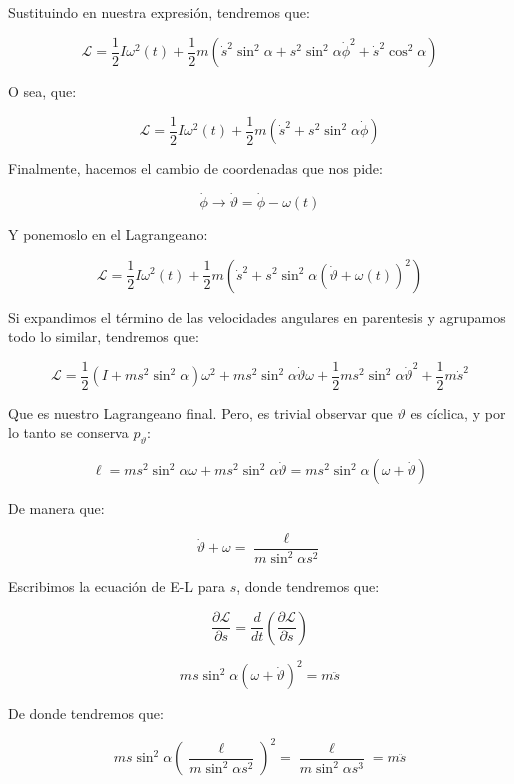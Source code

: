 \documentclass[a4paper,12pt]{article}
\begin{document}
Sustituindo en nuestra expresión, tendremos que:

$$\mathcal{L} = \frac{1}{2} I \omega^2(t)+ \frac{1}{2} m  (\dot{s}^2 \sin^2\alpha + s^2 \sin^2\alpha\dot{\phi}^2+\dot{s}^2 \cos^2\alpha)$$

O sea, que:

\begin{equation}
  \mathcal{L} = \frac{1}{2} I \omega^2(t) + \frac{1}{2} m (\dot{s}^2 + s^2\sin^2\alpha \dot{\phi})
\end{equation}

Finalmente, hacemos el cambio de coordenadas que nos pide:

$$\dot{\phi} \to \dot{\vartheta} = \dot{\phi} - \omega(t)$$

Y ponemoslo en el Lagrangeano:

$$\mathcal{L} = \frac{1}{2} I \omega^2(t) + \frac{1}{2} m (\dot{s}^2 + s^2\sin^2\alpha (\dot{\vartheta} + \omega(t))^2)$$

Si expandimos el término de las velocidades angulares en parentesis y agrupamos todo lo similar, tendremos que:


\begin{equation}
  \mathcal{L} = \frac{1}{2}(I+m s^2 \sin^2\alpha ) \omega^{2} + m s^{2}\sin^2\alpha \dot{\vartheta}\omega + \frac{1}{2}ms^2 \sin^2\alpha \dot{\vartheta}^2 + \frac{1}{2}m\dot{s}^2
\end{equation}

Que es nuestro Lagrangeano final. Pero, es trivial observar que $\vartheta$ es cíclica, y por lo tanto se conserva $p_{\vartheta}$:

\begin{equation}
  \ell = m s^2 \sin^2\alpha \omega + m s^2 \sin^2\alpha \dot{\vartheta} = m s^2 \sin^2\alpha (\omega + \dot{\vartheta}) 
\end{equation}

De manera que:

$$\dot{\vartheta} +  \omega = \frac{\ell}{m\sin^2\alpha s^2}   $$

Escribimos la ecuación de E-L para $s$, donde tendremos que:

$$\frac{\partial \mathcal{L}}{\partial s} = \frac{d}{dt}\left(\frac{\partial \mathcal{L}}{\partial \dot{s}}\right)$$  

$$m s \sin^2\alpha(\omega +\dot{\vartheta})^2 = m\ddot{s}$$

De donde tendremos que:

$$m s \sin^2{\alpha} \left(\frac{\ell}{m\sin^2\alpha s^2}\right)^2  = \frac{\ell}{m \sin^2\alpha s^3 } = m\ddot{s}$$
\end{document}
